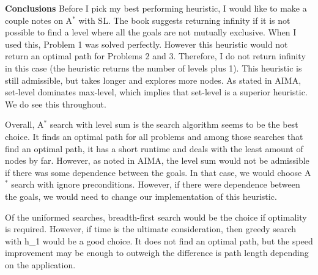 \documentclass{article}
\begin{document}
{\Large \textbf{Conclusions}}
\vskip1pt
Before I pick my best performing heuristic, I would like to make a couple notes on A$^*$ with SL. The book suggests returning infinity if it is not possible to find a level where all the goals are not mutually exclusive. When I used this, Problem 1 was solved perfectly. However this heuristic would not return an optimal path for Problems 2 and 3. Therefore, I do not return infinity in this case (the heuristic returns the number of levels plus 1). This heuristic is still admissible, but takes longer and explores more nodes. As stated in AIMA, set-level dominates max-level, which implies that set-level is a superior heuristic. We do see this throughout.

Overall, A$^*$ search with level sum is the search algorithm seems to be the best choice. It finds an optimal path for all problems and among those searches that find an optimal path, it has a short runtime and deals with the least amount of nodes by far. However, as noted in AIMA, the level sum would not be admissible if there was some dependence between the goals. In that case, we would choose A$^*$ search with ignore preconditions. However, if there were dependence between the goals, we would need to change our implementation of this heuristic.

Of the uniformed searches, breadth-first search would be the choice if optimality is required. However, if time is the ultimate consideration, then greedy search with h\_1 would be a good choice. It does not find an optimal path, but the speed improvement may be enough to outweigh the difference is path length depending on the application.
\end{document}
